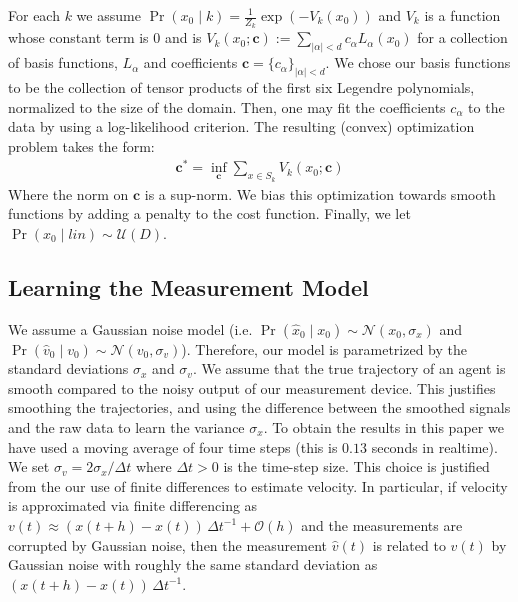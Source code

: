 \documentclass[letterpaper,10pt,conference]{ieeeconf}
\begin{document}
  For each $k$ we assume $\Pr( x_0 \mid k) = \frac{1}{Z_k} \exp( - V_k(x_0) )$ and $V_k$ is a function whose constant term is $0$ and is  $V_k(x_0; \mathbf{c} ) := \sum_{|\alpha|< d} c_{\alpha} L_{\alpha}( x_0)$ for a collection of basis functions, $L_{\alpha}$ and coefficients $\mathbf{c} = \{ c_{\alpha} \}_{|\alpha| < d}$.
  We chose our basis functions to be the collection of tensor products of the first six Legendre polynomials, normalized to the size of the domain.
  Then, one may fit the coefficients $c_{\alpha}$ to the data by using a log-likelihood criterion.
  The resulting (convex) optimization problem takes the form:
  \begin{align}
  	\mathbf{c}^* = \inf_{ \mathbf{c} } \sum_{x \in S_k} V_k( x_0; \mathbf{c})
  \end{align}
  Where the norm on $\mathbf{c}$ is a sup-norm.
  We bias this optimization towards smooth functions by adding a penalty to the cost function.
    Finally, we let $\Pr( x_0 \mid lin) \sim \mathcal{U}(D)$.
  
  \subsection{Learning the Measurement Model}
  We assume a Gaussian noise model (i.e. $\Pr( \hat{x}_0 \mid x_0 ) \sim \mathcal{N}( x_0 , \sigma_x)$ and $\Pr( \hat{v}_0 \mid v_0 ) \sim \mathcal{N}( v_0, \sigma_v)$).
  Therefore, our model is parametrized by the standard deviations $\sigma_x$ and $\sigma_v$.
  We assume that the true trajectory of an agent is smooth compared to the noisy output of our measurement device.
  This justifies smoothing the trajectories, and using the difference between the smoothed signals and the raw data to learn the variance $\sigma_x$.
  To obtain the results in this paper we have used a moving average of four time steps (this is $0.13$ seconds in realtime).
  We set $\sigma_v = 2 \sigma_x / \Delta t$ where $\Delta t > 0$ is the time-step size.  
  This choice is justified from the our use of finite differences to estimate velocity.
  In particular, if velocity is approximated via finite differencing as $v(t) \approx (x(t+h) - x(t))\,\Delta t^{-1} + \mathcal{O}(h)$ and the measurements are corrupted by Gaussian noise, then the measurement $\hat{v}(t)$ is related to $v(t)$ by Gaussian noise with roughly the same standard deviation as $(x(t+h) - x(t))\,\Delta t^{-1}$.
  
\end{document}
